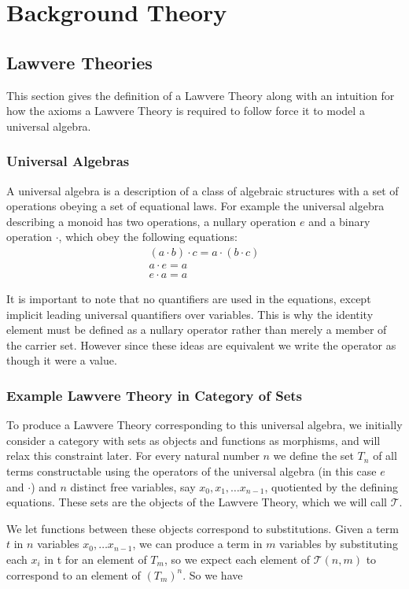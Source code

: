\chapter{Background Theory}
\section{Lawvere Theories}
This section gives the definition of a Lawvere Theory along with an intuition
for how the axioms a Lawvere Theory is required to follow force it to model a
universal algebra. 

\subsection{Universal Algebras}
A universal algebra is a description of a class of algebraic structures with a
set of operations obeying a set of equational laws. For example the universal
algebra describing a monoid has two operations, a nullary operation $e$ and a
binary operation $\cdot$, which obey the following equations:
\begin{gather*}
    (a\cdot b)\cdot c = a\cdot (b\cdot c) \\
    a \cdot e = a \\
    e \cdot a = a
\end{gather*}

It is important to note that no quantifiers are used in the equations, except
implicit leading universal quantifiers over variables. This is why the identity
element must be defined as a nullary operator rather than merely a member of the
carrier set. However since these ideas are equivalent we write the operator as
though it were a value.

\subsection{Example Lawvere Theory in Category of Sets}
To produce a Lawvere Theory corresponding to this universal algebra, we
initially consider a category with sets as objects and functions as morphisms,
and will relax this constraint later. For every natural number $n$ we define the
set $T_n$ of all terms constructable using the operators of the universal
algebra (in this case $e$ and $\cdot$) and $n$ distinct free variables, say
$x_0, x_1,\ldots x_{n-1}$, quotiented by the defining equations. These sets are
the objects of the Lawvere Theory, which we will call $\mathcal{T}$.

We let functions between these objects correspond to substitutions. Given a term
$t$ in $n$ variables $x_0,\ldots x_{n-1}$, we can produce a term in $m$
variables by substituting each $x_i$ in t for an element of $T_m$, so we expect
each element of $\mathcal{T}(n, m)$ to correspond to an element of $(T_m)^n$. So
we have


